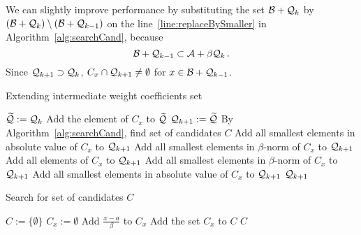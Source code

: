 We can slightly improve performance by substituting the set $\mathcal{B} + \mathcal{Q}_{k}$ by $(\mathcal{B} + \mathcal{Q}_{k})\setminus (\mathcal{B} + \mathcal{Q}_{k-1})$ on the line~\ref{line:replaceBySmaller} in Algorithm~\ref{alg:searchCand}, because
$$
\mathcal{B} + \mathcal{Q}_{k-1} \subset \mathcal{A} + \beta \mathcal{Q}_{k}\,.
$$
Since $\mathcal{Q}_{k+1} \supset \mathcal{Q}_{k}$, $C_x \cap \mathcal{Q}_{k+1} \neq \emptyset$ for  $x\in \mathcal{B} + \mathcal{Q}_{k-1}$.

\begin{algorithm}
  \caption{Extending intermediate weight coefficients set}
    \label{alg:extendWeightCoefSet}
  \begin{algorithmic}[1]
    \STATE $\widetilde{\mathcal{Q}}:=\mathcal{Q}_{k}$
		    	\STATE Add the element of $C_x$ to $\widetilde{\mathcal{Q}}$
			\ENDIF
		\ENDFOR
	\ENDIF
    \STATE $\mathcal{Q}_{k+1}:=\widetilde{\mathcal{Q}}$
    \STATE By Algorithm~\ref{alg:searchCand}, find set of candidates $C$
	        	\STATE Add all smallest elements in absolute value of $C_x$ to $\mathcal{Q}_{k+1}$
	        	\STATE Add all smallest elements in $\beta$-norm of $C_x$ to $\mathcal{Q}_{k+1}$
	        	\STATE Add all elements of $C_x$ to $\mathcal{Q}_{k+1}$
	        	\STATE Add all smallest elements in $\beta$-norm of $C_x$ to $\mathcal{Q}_{k+1}$
	        	\STATE Add all smallest elements in absolute value of $C_x$ to $\mathcal{Q}_{k+1}$ 
	        \ENDIF
        \ENDIF
    \ENDFOR
    \RETURN $\mathcal{Q}_{k+1}$
  \end{algorithmic}
\end{algorithm}



\begin{algorithm}
  \caption{Search for set of candidates $C$}
    \label{alg:searchCand}
  \begin{algorithmic}[1]
    \STATE $C:=\{\emptyset\}$
     \label{line:replaceBySmaller}
      \STATE $C_x:=\emptyset$
              \STATE Add $\frac{x-a}{\beta}$ to $C_x$
            \ENDIF
      \ENDFOR 
      \STATE Add the set $C_x$ to $C$
  \ENDFOR
  \RETURN $C$
  \end{algorithmic}
\end{algorithm}  
